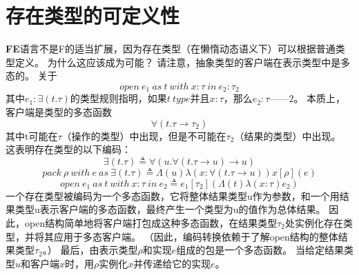 ﻿\section{存在类型的可定义性}

\textbf{FE}语言不是F的适当扩展，因为存在类型（在懒惰动态语义下）可以根据普通类型定义。
为什么这应该成为可能？
请注意，抽象类型的客户端在表示类型中是多态的。
关于
$$open\ e_{1}\ as\ t\ with\ x:\tau\ in\ e_{2}:\tau_{2}$$
其中$e_{1}:\exists(t.\tau)$的类型规则指明，如果$t\ type$并且$x:\tau$，那么$e_{2}:\tau——{2}$。
本质上，客户端是类型的多态函数
$$\forall(t.\tau \rightarrow \tau_{2})$$
其中t可能在$\tau$（操作的类型）中出现，但是不可能在$\tau_{2}$（结果的类型）中出现。
这表明存在类型的以下编码：
$$\exists(t.\tau) \triangleq \forall(u.\forall(t.\tau \rightarrow u) \rightarrow u)$$
$$pack\ \rho\ with\ e\ as\ \exists(t.\tau) \triangleq \Lambda(u)\lambda(x:\forall(t.\tau \rightarrow u))x[\rho](e)$$
$$open\ e_{1}\ as\ t\ with\ x:\tau\ in\ e_{2} \triangleq e_{1}[\tau_{2}](\Lambda(t)\lambda(x:\tau)e_{2})$$
一个存在类型被编码为一个多态函数，它将整体结果类型u作为参数，和一个用结果类型u表示客户端的多态函数，最终产生一个类型为u的值作为总体结果。 因此，open结构简单地将客户端打包成这种多态函数，在结果类型$\tau_{2}$处实例化存在类型，并将其应用于多态客户端。
（因此，编码转换依赖于了解open结构的整体结果类型$\tau_{2}$。）
最后，由表示类型$\rho$和实现$e$组成的包是一个多态函数。
当给定结果类型$u$和客户端$x$时，用$\rho$实例化$x$并传递给它的实现$e$。
